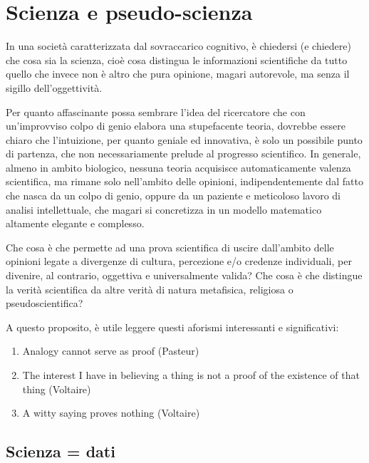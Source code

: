 \documentclass[a4paper,12pt,oneside]{book}
\providecommand{\tightlist}{%
  \setlength{\itemsep}{0pt}\setlength{\parskip}{0pt}}
\begin{document}
\hypertarget{scienza-e-pseudo-scienza}{%
\chapter{Scienza e pseudo-scienza}\label{scienza-e-pseudo-scienza}}

In una società caratterizzata dal sovraccarico cognitivo, è chiedersi (e chiedere) che cosa sia la scienza, cioè cosa distingua le informazioni scientifiche da tutto quello che invece non è altro che pura opinione, magari autorevole, ma senza il sigillo dell'oggettività.

Per quanto affascinante possa sembrare l'idea del ricercatore che con un'improvviso colpo di genio elabora una stupefacente teoria, dovrebbe essere chiaro che l'intuizione, per quanto geniale ed innovativa, è solo un possibile punto di partenza, che non necessariamente prelude al progresso scientifico. In generale, almeno in ambito biologico, nessuna teoria acquisisce automaticamente valenza scientifica, ma rimane solo nell'ambito delle opinioni, indipendentemente dal fatto che nasca da un colpo di genio, oppure da un paziente e meticoloso lavoro di analisi intellettuale, che magari si concretizza in un modello matematico altamente elegante e complesso.

Che cosa è che permette ad una prova scientifica di uscire dall'ambito delle opinioni legate a divergenze di cultura, percezione e/o credenze individuali, per divenire, al contrario, oggettiva e universalmente valida? Che cosa è che distingue la verità scientifica da altre verità di natura metafisica, religiosa o pseudoscientifica?

A questo proposito, è utile leggere questi aforismi interessanti e significativi:

\begin{enumerate}
\def\labelenumi{\arabic{enumi}.}
\tightlist
\item
  Analogy cannot serve as proof (Pasteur)
\item
  The interest I have in believing a thing is not a proof of the existence of that thing (Voltaire)
\item
  A witty saying proves nothing (Voltaire)
\end{enumerate}

\hypertarget{scienza-dati}{%
\section{Scienza = dati}\label{scienza-dati}}
\end{document}
